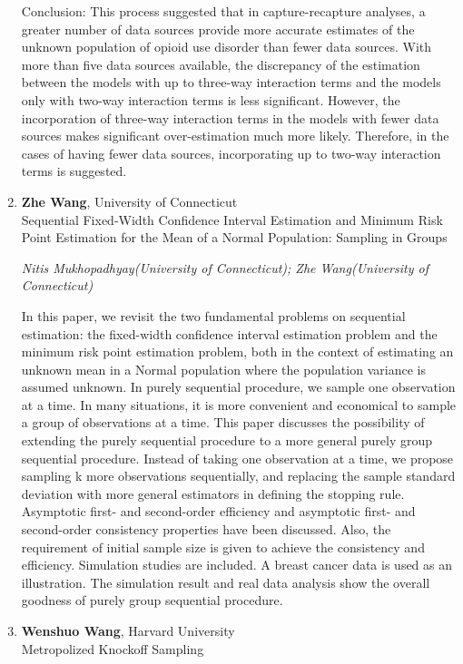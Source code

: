 \begin{enumerate}
Conclusion: This process suggested that in capture-recapture analyses, a greater number of data sources provide more accurate estimates of the unknown population of opioid use disorder than fewer data sources. With more than five data sources available, the discrepancy of the estimation between the models with up to three-way interaction terms and the models only with two-way interaction terms is less significant. However, the incorporation of three-way interaction terms in the models with fewer data sources makes significant over-estimation much more likely. Therefore, in the cases of having fewer data sources, incorporating up to two-way interaction terms is suggested.

\item \textbf{Zhe Wang}, University of Connecticut \\
Sequential Fixed-Width Confidence Interval Estimation and Minimum Risk Point Estimation for the Mean of a Normal Population: Sampling in Groups

\emph{\footnotesize Nitis Mukhopadhyay(University of Connecticut); Zhe Wang(University of Connecticut)}

In this paper, we revisit the two fundamental problems on sequential estimation: the fixed-width confidence interval estimation problem and the minimum risk point estimation problem, both in the context of estimating an unknown mean in a Normal population where the population variance is assumed unknown. In purely sequential procedure, we sample one observation at a time. In many situations, it is more convenient and economical to sample a group of observations at a time. This paper discusses the possibility of extending the purely sequential procedure to a more general purely group sequential procedure. Instead of taking one observation at a time, we propose sampling k more observations sequentially, and replacing the sample standard deviation with more general estimators in defining the stopping rule. Asymptotic first- and second-order efficiency and asymptotic first- and second-order consistency properties have been discussed. Also, the requirement of initial sample size is given to achieve the consistency and efficiency. Simulation studies are included. A breast cancer data is used as an illustration. The simulation result and real data analysis show the overall goodness of purely group sequential procedure.

\item \textbf{Wenshuo Wang}, Harvard University \\
Metropolized Knockoff Sampling


\end{enumerate}

